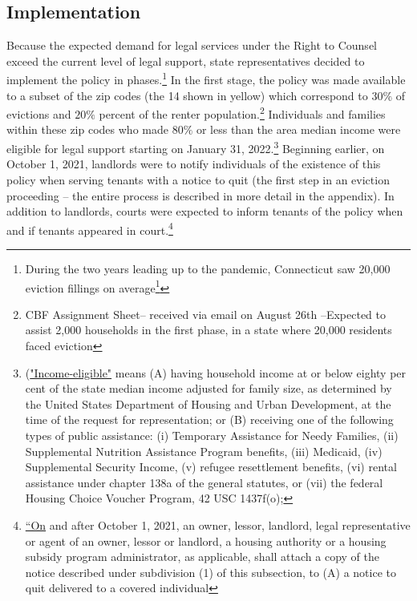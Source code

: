 \documentclass[a4paper,12pt]{article}
\begin{document}
\subsection{Implementation}
Because the expected demand for legal services under the Right to Counsel exceed the current level of legal support, state representatives decided to implement the policy in phases.\footnote{During the two years leading up to the pandemic, Connecticut saw 20,000 eviction fillings on average\footnote{\href{https://youtu.be/sLpi4xlVGgU?t=1002}{link}}} In the first stage, the policy was made available to a subset of the zip codes (the 14 shown in yellow) which correspond to $30\%$ of evictions and $20\%$ percent of the renter population.\footnote{CBF Assignment Sheet-- received via email on August 26th --Expected to assist 2,000 households in the first phase, in a state where 20,000 residents faced eviction} Individuals and families within these zip codes who made $80\%$ or less than the area median income were eligible for legal support starting on January 31, 2022.\footnote{(\href{https://www.cga.ct.gov/2021/ACT/PA/PDF/2021PA-00034-R00HB-06531-PA.PDF}{"Income-eligible"} means (A) having household income at or below
eighty per cent of the state median income adjusted for family size, as
determined by the United States Department of Housing and Urban
Development, at the time of the request for representation; or (B)
receiving one of the following types of public assistance: (i) Temporary
Assistance for Needy Families, (ii) Supplemental Nutrition Assistance
Program benefits, (iii) Medicaid, (iv) Supplemental Security Income, (v)
refugee resettlement benefits, (vi) rental assistance under chapter 138a
of the general statutes, or (vii) the federal Housing Choice Voucher
Program, 42 USC 1437f(o); } Beginning earlier, on October 1, 2021, landlords were to notify individuals of the existence of this policy when serving tenants with a notice to quit (the first step in an eviction proceeding -- the entire process is described in more detail in the appendix). In addition to landlords, courts were expected to inform tenants of the policy when and if tenants appeared in court.\footnote{\href{https://www.cga.ct.gov/2021/ACT/PA/PDF/2021PA-00034-R00HB-06531-PA.PDF}{``On} and after October 1, 2021, an owner, lessor, landlord, legal
representative or agent of an owner, lessor or landlord, a housing
authority or a housing subsidy program administrator, as applicable,
shall attach a copy of the notice described under subdivision (1) of this
subsection, to (A) a notice to quit delivered to a covered individual
}
\end{document}
